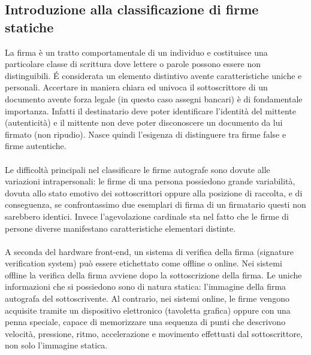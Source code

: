 \subsection{Introduzione alla classificazione di firme statiche}
\label{2.1}
La firma è un tratto comportamentale di un individuo e costituisce una particolare classe di scrittura dove lettere o parole possono essere non distinguibili. \'{E} considerata un elemento distintivo avente caratteristiche uniche e personali. Accertare in maniera chiara ed univoca il sottoscrittore di un documento avente forza legale (in questo caso assegni bancari) è di fondamentale importanza. Infatti il destinatario deve poter identificare l'identità del mittente (autenticità) e il mittente non deve poter disconoscere un documento da lui firmato (non ripudio). Nasce quindi l'esigenza di distinguere tra firme false e firme autentiche.\\\\
Le difficoltà principali nel classificare le firme autografe sono dovute alle variazioni intrapersonali: le firme di una persona possiedono grande variabilità, dovuta allo stato emotivo dei sottoscrittori oppure alla posizione di raccolta, e di conseguenza, se confrontassimo due esemplari di firma di un firmatario questi non sarebbero identici. Invece l'agevolazione cardinale sta nel fatto che le firme di persone diverse manifestano caratteristiche elementari distinte.\\\\
A seconda del hardware front-end, un sistema di verifica della firma (signature verification system) può essere etichettato come offline o online. Nei sistemi offline la verifica della firma avviene dopo la sottoscrizione della firma. Le uniche informazioni che si possiedono sono di natura statica: l'immagine della firma autografa del sottoscrivente. Al contrario, nei sistemi online, le firme vengono acquisite tramite un dispositivo elettronico (tavoletta grafica) oppure con una penna speciale, capace di memorizzare una sequenza di punti che descrivono velocità, pressione, ritmo, accelerazione e movimento effettuati dal sottoscrittore, non solo l'immagine statica.

